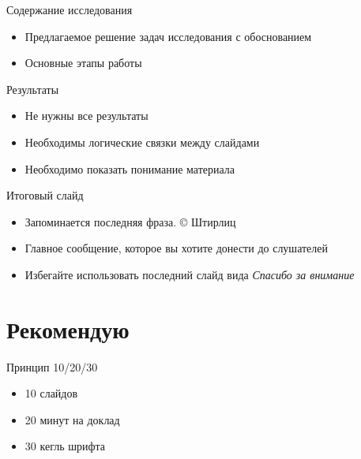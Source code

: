 \documentclass[
  ignorenonframetext,
  aspectratio=169,
]{beamer}
\providecommand{\tightlist}{%
  \setlength{\itemsep}{0pt}\setlength{\parskip}{0pt}}\usepackage{longtable,booktabs,array}
\begin{document}
\begin{frame}{Содержание исследования}
\label{ux441ux43eux434ux435ux440ux436ux430ux43dux438ux435-ux438ux441ux441ux43bux435ux434ux43eux432ux430ux43dux438ux44f}
\begin{itemize}[<+->]
\tightlist
\item
  Предлагаемое решение задач исследования с обоснованием
\item
  Основные этапы работы
\end{itemize}
\end{frame}

\begin{frame}{Результаты}
\label{ux440ux435ux437ux443ux43bux44cux442ux430ux442ux44b-1}
\begin{itemize}[<+->]
\tightlist
\item
  Не нужны все результаты
\item
  Необходимы логические связки между слайдами
\item
  Необходимо показать понимание материала
\end{itemize}
\end{frame}

\begin{frame}{Итоговый слайд}
\label{ux438ux442ux43eux433ux43eux432ux44bux439-ux441ux43bux430ux439ux434}
\begin{itemize}[<+->]
\tightlist
\item
  Запоминается последняя фраза. © Штирлиц
\item
  Главное сообщение, которое вы хотите донести до слушателей
\item
  Избегайте использовать последний слайд вида \emph{Спасибо за внимание}
\end{itemize}
\end{frame}

\section{Рекомендую}\label{ux440ux435ux43aux43eux43cux435ux43dux434ux443ux44e}

\begin{frame}{Принцип 10/20/30}
\label{ux43fux440ux438ux43dux446ux438ux43f-102030}
\begin{itemize}[<+->]
\tightlist
\item
  10 слайдов
\item
  20 минут на доклад
\item
  30 кегль шрифта
\end{itemize}
\end{frame}
\end{document}
